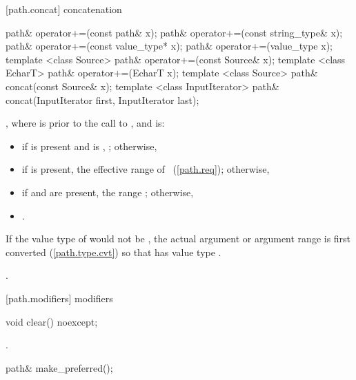[path.concat]{ concatenation}

\begin{itemdecl}
path& operator+=(const path& x);
path& operator+=(const string_type& x);
path& operator+=(const value_type* x);
path& operator+=(value_type x);
template <class Source>
  path& operator+=(const Source& x);
template <class EcharT>
  path& operator+=(EcharT x);
template <class Source>
  path& concat(const Source& x);
template <class InputIterator>
  path& concat(InputIterator first, InputIterator last);
\end{itemdecl}

\begin{itemdescr}
\pnum
\postcondition {},
 where  is  prior to the call to ,
 and  is:
 \begin{itemize}
\item if  is present and is ,
 ; otherwise,
\item if  is present,
 the effective range of ~(\ref{path.req}); otherwise,
\item if  and  are present,
 the range ; otherwise,
\item {}.
\end{itemize}
If the value type of  would not be ,
  the actual argument or argument range is first converted (\ref{path.type.cvt}) so that  has value type .

\pnum
\returns {}.
\end{itemdescr}

[path.modifiers]{ modifiers}

\begin{itemdecl}
void clear() noexcept;
\end{itemdecl}

\begin{itemdescr}
\pnum
\postcondition {}.
\end{itemdescr}

\begin{itemdecl}
path& make_preferred();
\end{itemdecl}

